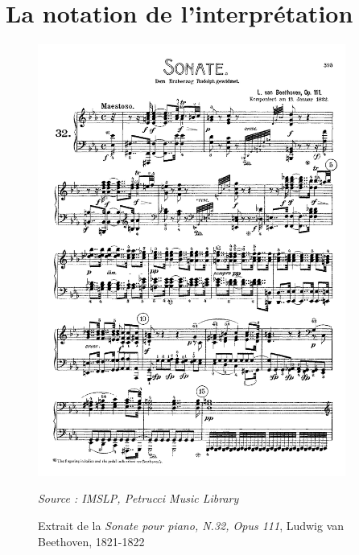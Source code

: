 \section{La notation de l'interprétation}
\label{sec:exempleNotationInterpretation}
\begin{figure}[H]
	\centering
	\includegraphics[keepaspectratio=true, width=0.9\textwidth]{Annexes/i/exempleNotationInterpretation.png}
	\caption{Extrait de la \textit{Sonate pour piano, N.32, Opus 111}, Ludwig van Beethoven, 1821-1822}
	\medskip
	\small
	\textit{Source : IMSLP, Petrucci Music Library} 	
	\label{fig:exempleNotationInterpretation}
\end{figure}

